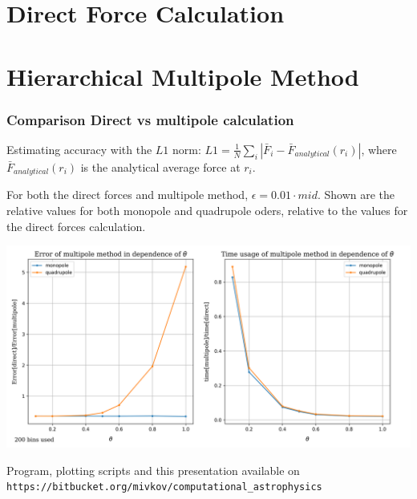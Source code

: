 \begin{frame}{}
	\titlepage
\end{frame}

%


\section{Direct Force Calculation}



\section{Hierarchical Multipole Method}




\begin{frame}
	\frametitle{Comparison Direct vs multipole calculation}
	
	Estimating accuracy with the $L1$ norm: $L1 = \frac{1}{N} \sum\limits_i |\bar{F}_i - \bar{F}_{analytical}(r_i)|$, where $\bar{F}_{analytical}(r_i)$  is the analytical average force at $r_i$.
	
	For both the direct forces and multipole method, $\epsilon = 0.01 \cdot mid$. Shown are the relative values for both monopole and quadrupole oders, relative to the values for the direct forces calculation.
	
	\centering
	\includegraphics[width=\textwidth]{../results/multipole_forces/compare_direct_multipole.png}
\end{frame}






\begin{frame}[fragile]
	Program, plotting scripts and this presentation available on \verb!https://bitbucket.org/mivkov/computational_astrophysics!
\end{frame}









